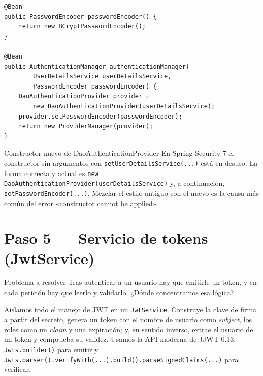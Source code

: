 \documentclass[11pt]{article}
\begin{document}
\begin{cajacodigo}
\begin{lstlisting}[style=java]
@Bean
public PasswordEncoder passwordEncoder() {
    return new BCryptPasswordEncoder();
}

@Bean
public AuthenticationManager authenticationManager(
        UserDetailsService userDetailsService,
        PasswordEncoder passwordEncoder) {
    DaoAuthenticationProvider provider =
        new DaoAuthenticationProvider(userDetailsService);
    provider.setPasswordEncoder(passwordEncoder);
    return new ProviderManager(provider);
}
\end{lstlisting}
\end{cajacodigo}

\begin{cajawarn}{Constructor nuevo de DaoAuthenticationProvider}
En Spring Security 7 el constructor sin argumentos con \texttt{setUserDetailsService(...)} está en desuso. La forma correcta y actual es \texttt{new DaoAuthenticationProvider(userDetailsService)} y, a continuación, \texttt{setPasswordEncoder(...)}. Mezclar el estilo antiguo con el nuevo es la causa más común del error «constructor cannot be applied».\par
\end{cajawarn}

\section{Paso 5 --- Servicio de tokens (JwtService)}
\begin{cajaproblema}{Problema a resolver}
Tras autenticar a un usuario hay que emitirle un token, y en cada petición hay que leerlo y validarlo. ¿Dónde concentramos esa lógica?\par
\end{cajaproblema}
Aislamos todo el manejo de JWT en un \texttt{JwtService}. Construye la clave de firma a partir del secreto, genera un token con el nombre de usuario como \emph{subject}, los roles como un \emph{claim} y una expiración; y, en sentido inverso, extrae el usuario de un token y comprueba su validez. Usamos la API moderna de JJWT 0.13: \texttt{Jwts.\allowbreak{}builder()} para emitir y \texttt{Jwts.\allowbreak{}parser().\allowbreak{}verifyWith(...).\allowbreak{}build().\allowbreak{}parseSignedClaims(...)} para verificar.
\end{document}
